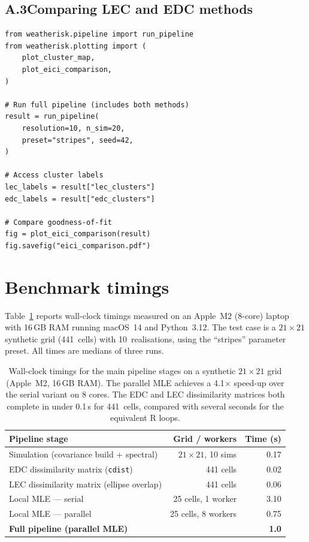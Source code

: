 \documentclass[preprint,12pt,a4paper]{elsarticle}
\begin{document}
\subsection{A.3\quad Comparing LEC and EDC methods}

\begin{lstlisting}[caption={Running both clustering methods
  and comparing results.}, label=lst:app-compare]
from weatherisk.pipeline import run_pipeline
from weatherisk.plotting import (
    plot_cluster_map,
    plot_eici_comparison,
)

# Run full pipeline (includes both methods)
result = run_pipeline(
    resolution=10, n_sim=20,
    preset="stripes", seed=42,
)

# Access cluster labels
lec_labels = result["lec_clusters"]
edc_labels = result["edc_clusters"]

# Compare goodness-of-fit
fig = plot_eici_comparison(result)
fig.savefig("eici_comparison.pdf")
\end{lstlisting}

\section{Benchmark timings}
\label{app:benchmark}

Table~\ref{tab:benchmark} reports wall-clock timings measured on an
Apple~M2 (8-core) laptop with 16\,GB RAM running
macOS~14 and Python~3.12.  The test case is a $21\times 21$ synthetic
grid (441~cells) with 10~realisations, using the ``stripes''
parameter preset.  All times are medians of three runs.

\begin{table}[ht]
\centering
\begin{tabular}{lrr}
\toprule
\textbf{Pipeline stage} & \textbf{Grid / workers} & \textbf{Time (s)} \\
\midrule
Simulation (covariance build + spectral) & $21\!\times\!21$, 10 sims & 0.17 \\
EDC dissimilarity matrix (\texttt{cdist}) & 441 cells & 0.02 \\
LEC dissimilarity matrix (ellipse overlap) & 441 cells & 0.06 \\
Local MLE --- serial & 25 cells, 1 worker & 3.10 \\
Local MLE --- parallel & 25 cells, 8 workers & 0.75 \\
\midrule
\textbf{Full pipeline (parallel MLE)} & & \textbf{1.0} \\
\bottomrule
\end{tabular}
\caption{Wall-clock timings for the main pipeline stages on a
  synthetic $21\times 21$ grid (Apple~M2, 16\,GB RAM).
  The parallel MLE achieves a 4.1$\times$ speed-up over the
  serial variant on 8 cores.  The EDC and LEC dissimilarity
  matrices both complete in under 0.1\,s for 441~cells,
  compared with several seconds for the equivalent
  R loops.}
\label{tab:benchmark}
\end{table}
\end{document}
